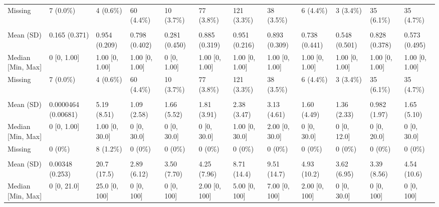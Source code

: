\documentclass[
  single column]{article}
\begin{document}
\begin{landscape}
\begin{longtable}[t]{llllllllllll}
\hspace{1em}Missing & 7 (0.0\%) & 4 (0.6\%) & 60 (4.4\%) & 10 (3.7\%) & 77 (3.8\%) & 121 (3.3\%) & 38 (3.5\%) & 6 (4.4\%) & 3 (3.4\%) & 35 (6.1\%) & 35 \vphantom{1} (4.7\%)\\
\addlinespace[0.3em]
\multicolumn{12}{l}{\textbf{Belief in God}}\\
\hspace{1em}Mean (SD) & 0.165 (0.371) & 0.954 (0.209) & 0.798 (0.402) & 0.281 (0.450) & 0.885 (0.319) & 0.951 (0.216) & 0.893 (0.309) & 0.738 (0.441) & 0.548 (0.501) & 0.828 (0.378) & 0.573 (0.495)\\
\hspace{1em}Median [Min, Max] & 0 [0, 1.00] & 1.00 [0, 1.00] & 1.00 [0, 1.00] & 0 [0, 1.00] & 1.00 [0, 1.00] & 1.00 [0, 1.00] & 1.00 [0, 1.00] & 1.00 [0, 1.00] & 1.00 [0, 1.00] & 1.00 [0, 1.00] & 1.00 [0, 1.00]\\
\hspace{1em}Missing & 7 (0.0\%) & 4 (0.6\%) & 60 (4.4\%) & 10 (3.7\%) & 77 (3.8\%) & 121 (3.3\%) & 38 (3.5\%) & 6 (4.4\%) & 3 (3.4\%) & 35 (6.1\%) & 35 (4.7\%)\\
\addlinespace[0.3em]
\multicolumn{12}{l}{\textbf{Monthly Religious Service Attendence}}\\
\hspace{1em}Mean (SD) & 0.0000464 (0.00681) & 5.19 (8.51) & 1.09 (2.58) & 1.66 (5.52) & 1.81 (3.91) & 2.38 (3.47) & 3.13 (4.61) & 1.60 (4.49) & 1.36 (2.33) & 0.982 (1.97) & 1.65 (5.10)\\
\hspace{1em}Median [Min, Max] & 0 [0, 1.00] & 1.00 [0, 30.0] & 0 [0, 30.0] & 0 [0, 30.0] & 0 [0, 30.0] & 1.00 [0, 30.0] & 2.00 [0, 30.0] & 0 [0, 30.0] & 0 [0, 12.0] & 0 [0, 20.0] & 0 [0, 30.0]\\
\hspace{1em}Missing & 0 (0\%) & 8 (1.2\%) & 0 (0\%) & 0 (0\%) & 0 (0\%) & 0 (0\%) & 0 (0\%) & 0 (0\%) & 0 (0\%) & 0 (0\%) & 0 \vphantom{2} (0\%)\\
\addlinespace[0.3em]
\multicolumn{12}{l}{\textbf{Weekly Prayer}}\\
\hspace{1em}Mean (SD) & 0.00348 (0.253) & 20.7 (17.5) & 2.89 (6.12) & 3.50 (7.70) & 4.25 (7.96) & 8.71 (14.4) & 9.51 (14.7) & 4.93 (10.2) & 3.62 (6.95) & 3.39 (8.56) & 4.54 (10.6)\\
\hspace{1em}Median [Min, Max] & 0 [0, 21.0] & 25.0 [0, 100] & 0 [0, 100] & 0 [0, 100] & 2.00 [0, 100] & 5.00 [0, 100] & 7.00 [0, 100] & 2.00 [0, 100] & 0 [0, 30.0] & 0 [0, 100] & 0 [0, 100]\\

\end{longtable}
\end{landscape}
\end{document}

